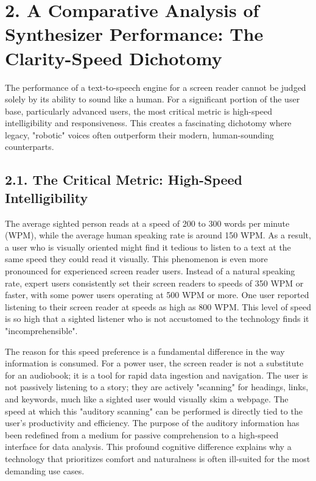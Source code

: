 \section{2. A Comparative Analysis of Synthesizer Performance: The Clarity-Speed Dichotomy}
The performance of a text-to-speech engine for a screen reader cannot be
judged solely by its ability to sound like a human. For a significant
portion of the user base, particularly advanced users, the most critical
metric is high-speed intelligibility and responsiveness. This creates a
fascinating dichotomy where legacy, "robotic" voices often outperform
their modern, human-sounding counterparts.

\subsection{2.1. The Critical Metric: High-Speed Intelligibility}
The average sighted person reads at a speed of 200 to 300 words per
minute (WPM), while the average human speaking rate is around 150
WPM.\supercite{14} As a result, a user who is visually oriented might find it
tedious to listen to a text at the same speed they could read it
visually.\supercite{14} This phenomenon is even more pronounced for experienced
screen reader users. Instead of a natural speaking rate, expert users
consistently set their screen readers to speeds of 350 WPM or faster,
with some power users operating at 500 WPM or more.\supercite{14} One user
reported listening to their screen reader at speeds as high as 800
WPM.\supercite{16} This level of speed is so high that a sighted listener who is
not accustomed to the technology finds it "incomprehensible".\supercite{17}

The reason for this speed preference is a fundamental difference in the
way information is consumed. For a power user, the screen reader is not
a substitute for an audiobook; it is a tool for rapid data ingestion and
navigation.\supercite{15} The user is not passively listening to a story; they are
actively "scanning" for headings, links, and keywords, much like a
sighted user would visually skim a webpage.\supercite{15} The speed at which this
"auditory scanning" can be performed is directly tied to the user's
productivity and efficiency. The purpose of the auditory information has
been redefined from a medium for passive comprehension to a high-speed
interface for data analysis. This profound cognitive difference explains
why a technology that prioritizes comfort and naturalness is often
ill-suited for the most demanding use cases.

